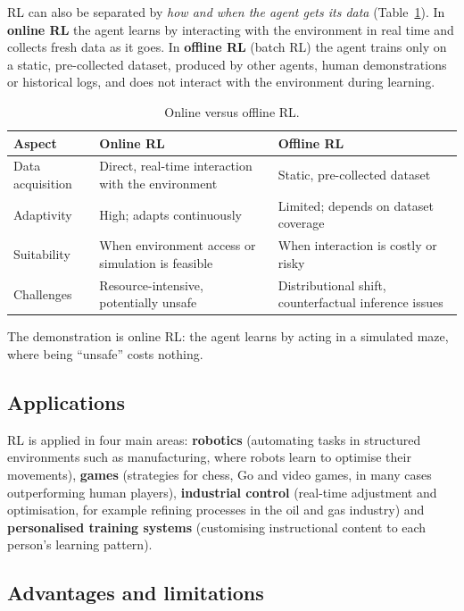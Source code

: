 \documentclass[11pt, a4paper]{article}
\begin{document}
RL can also be separated by \emph{how and when the agent gets its data} (Table~\ref{tab:onoff}). In \textbf{online RL} the agent learns by interacting with the environment in real time and collects fresh data as it goes. In \textbf{offline RL} (batch RL) the agent trains only on a static, pre-collected dataset, produced by other agents, human demonstrations or historical logs, and does not interact with the environment during learning.

\begin{table}[H]
\centering
\small
\caption{Online versus offline RL.}
\label{tab:onoff}
\begin{tabularx}{\textwidth}{l X X}
\toprule
Aspect & Online RL & Offline RL \\
\midrule
Data acquisition & Direct, real-time interaction with the environment & Static, pre-collected dataset \\
Adaptivity & High; adapts continuously & Limited; depends on dataset coverage \\
Suitability & When environment access or simulation is feasible & When interaction is costly or risky \\
Challenges & Resource-intensive, potentially unsafe & Distributional shift, counterfactual inference issues \\
\bottomrule
\end{tabularx}
\end{table}

The demonstration is online RL: the agent learns by acting in a simulated maze, where being ``unsafe'' costs nothing.

\subsection{Applications}

RL is applied in four main areas: \textbf{robotics} (automating tasks in structured environments such as manufacturing, where robots learn to optimise their movements), \textbf{games} (strategies for chess, Go and video games, in many cases outperforming human players), \textbf{industrial control} (real-time adjustment and optimisation, for example refining processes in the oil and gas industry) and \textbf{personalised training systems} (customising instructional content to each person's learning pattern).

\subsection{Advantages and limitations}
\end{document}
